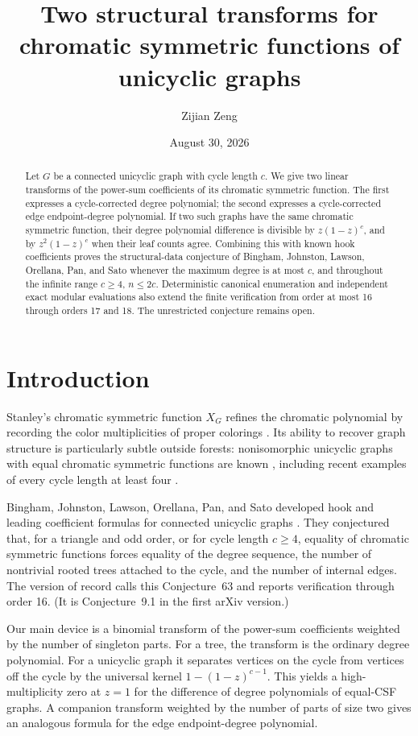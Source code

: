 \documentclass[11pt]{amsart}
\title[Two transforms for unicyclic chromatic symmetric functions]
{Two structural transforms for chromatic symmetric functions of unicyclic graphs}
\author{Zijian Zeng}
\date{August 30, 2026}
\theoremstyle{definition}
\newcommand{\CSF}{X}
\begin{document}
\begin{abstract}
Let \(G\) be a connected unicyclic graph with cycle length \(c\).  We give
two linear transforms of the power-sum coefficients of its chromatic
symmetric function.  The first expresses a cycle-corrected degree polynomial;
the second expresses a cycle-corrected edge endpoint-degree polynomial.  If
two such graphs have the same chromatic symmetric function, their degree
polynomial difference is divisible by \(z(1-z)^c\), and by
\(z^2(1-z)^c\) when their leaf counts agree.  Combining this with known hook
coefficients proves the structural-data conjecture of Bingham, Johnston,
Lawson, Orellana, Pan, and Sato whenever the maximum degree is at most \(c\),
and throughout the infinite range \(c\geq4\), \(n\leq2c\).  Deterministic
canonical enumeration and independent exact modular evaluations also extend
the finite verification from order at most 16 through orders 17 and 18.  The
unrestricted conjecture remains open.
\end{abstract}

\maketitle

\section{Introduction}

Stanley's chromatic symmetric function \(\CSF_G\) refines the chromatic
polynomial by recording the color multiplicities of proper colorings
\cite{Stanley1995}.  Its ability to recover graph structure is particularly
subtle outside forests: nonisomorphic unicyclic graphs with equal chromatic
symmetric functions are known \cite{OrellanaScott2014}, including recent
examples of every cycle length at least four \cite{Bingham2026Girth}.

Bingham, Johnston, Lawson, Orellana, Pan, and Sato developed hook and leading
coefficient formulas for connected unicyclic graphs
\cite{BinghamEtAl2026}.  They conjectured that, for a triangle and odd order,
or for cycle length \(c\geq4\), equality of chromatic symmetric functions
forces equality of the degree sequence, the number of nontrivial rooted
trees attached to the cycle, and the number of internal edges.  The
version of record calls this Conjecture~63 and reports verification through
order 16.  (It is Conjecture~9.1 in the first arXiv version.)

Our main device is a binomial transform of the power-sum coefficients weighted
by the number of singleton parts.  For a tree, the transform is the ordinary
degree polynomial.  For a unicyclic graph it separates vertices on the cycle
from vertices off the cycle by the universal kernel
\(1-(1-z)^{c-1}\).  This yields a high-multiplicity zero at \(z=1\) for
the difference of degree polynomials of equal-CSF graphs.  A companion
transform weighted by the number of parts of size two gives an analogous
formula for the edge endpoint-degree polynomial.
\end{document}
